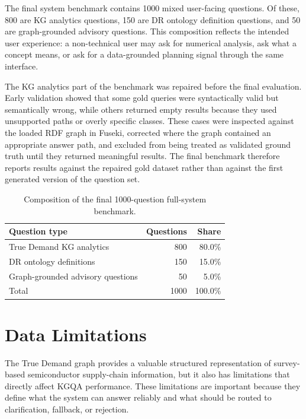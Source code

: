 \documentclass[
  12pt,
  english,
  oneside]{report}
\begin{document}
The final system benchmark contains 1000 mixed user-facing questions. Of these, 800 are KG analytics questions, 150 are DR ontology definition questions, and 50 are graph-grounded advisory questions. This composition reflects the intended user experience: a non-technical user may ask for numerical analysis, ask what a concept means, or ask for a data-grounded planning signal through the same interface.

The KG analytics part of the benchmark was repaired before the final evaluation. Early validation showed that some gold queries were syntactically valid but semantically wrong, while others returned empty results because they used unsupported paths or overly specific classes. These cases were inspected against the loaded RDF graph in Fuseki, corrected where the graph contained an appropriate answer path, and excluded from being treated as validated ground truth until they returned meaningful results. The final benchmark therefore reports results against the repaired gold dataset rather than against the first generated version of the question set.

\begin{table}[htbp]
\centering
\caption{Composition of the final 1000-question full-system benchmark.}
\label{tab:final-system-benchmark-composition}
\small
\begin{tabular}{lrr}
\toprule
\textbf{Question type} & \textbf{Questions} & \textbf{Share} \\
\midrule
True Demand KG analytics & 800 & 80.0\% \\
DR ontology definitions & 150 & 15.0\% \\
Graph-grounded advisory questions & 50 & 5.0\% \\
\midrule
Total & 1000 & 100.0\% \\
\bottomrule
\end{tabular}
\end{table}

\section{Data Limitations}
\label{sec:data-limitations}

The True Demand graph provides a valuable structured representation of survey-based semiconductor supply-chain information, but it also has limitations that directly affect KGQA performance. These limitations are important because they define what the system can answer reliably and what should be routed to clarification, fallback, or rejection.
\end{document}
